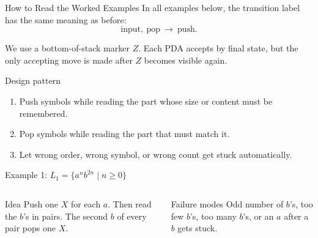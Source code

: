 \documentclass[aspectratio=169,10pt]{beamer}
\newcommand{\eps}{\varepsilon}
\begin{document}
\begin{frame}{How to Read the Worked Examples}
\small
In all examples below, the transition label has the same meaning as before:
\[
\boxed{\text{input},\ \text{pop}\ \to\ \text{push}}.
\]

We use a bottom-of-stack marker \(Z\).  Each PDA accepts by final state, but the only accepting move is made after \(Z\) becomes visible again.

\begin{exampleblock}{Design pattern}
\begin{enumerate}
    \item Push symbols while reading the part whose size or content must be remembered.
    \item Pop symbols while reading the part that must match it.
    \item Let wrong order, wrong symbol, or wrong count get stuck automatically.
\end{enumerate}
\end{exampleblock}
\end{frame}

\begin{frame}{Example 1: \(L_1=\{a^n b^{2n}\mid n\ge 0\}\)}
\small
\begin{columns}[T,onlytextwidth]
\begin{block}{Idea}
Push one \(X\) for each \(a\).  Then read the \(b\)'s in pairs.  The second \(b\) of every pair pops one \(X\).
\end{block}

\begin{alertblock}{Failure modes}
Odd number of \(b\)'s, too few \(b\)'s, too many \(b\)'s, or an \(a\) after a \(b\) gets stuck.
\end{alertblock}

\centering
{}
\end{columns}
\end{frame}
\end{document}
